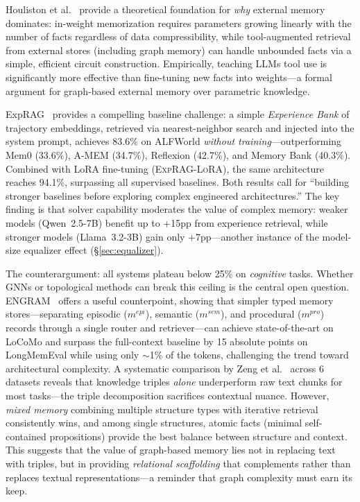 \documentclass[hf]{ceurart}
\begin{document}
Houliston et al.~\cite{toolscalable2026} provide a theoretical
foundation for \emph{why} external memory dominates: in-weight
memorization requires parameters growing linearly with the number
of facts regardless of data compressibility, while tool-augmented
retrieval from external stores (including graph memory) can handle
unbounded facts via a simple, efficient circuit construction.
Empirically, teaching LLMs tool use is significantly more effective
than fine-tuning new facts into weights---a formal argument for
graph-based external memory over parametric knowledge.

ExpRAG~\cite{exprag2026} provides a compelling baseline challenge:
a simple \emph{Experience Bank} of trajectory embeddings, retrieved
via nearest-neighbor search and injected into the system prompt,
achieves 83.6\% on ALFWorld \emph{without training}---outperforming
Mem0 (33.6\%), A-MEM (34.7\%), Reflexion (42.7\%), and Memory Bank
(40.3\%). Combined with LoRA fine-tuning (\textsc{ExpRAG-LoRA}),
the same architecture reaches 94.1\%, surpassing all supervised
baselines. Both results call for ``building stronger baselines before
exploring complex engineered architectures.'' The key finding is that
solver capability moderates the value of complex memory: weaker models
(Qwen~2.5-7B) benefit up to +15pp from experience retrieval, while
stronger models (Llama~3.2-3B) gain only +7pp---another instance of
the model-size equalizer effect (\S\ref{sec:equalizer}).

The counterargument: all systems plateau below 25\% on \emph{cognitive}
tasks. Whether GNNs or topological methods can break this ceiling is
the central open question. ENGRAM~\cite{engram2025} offers a useful
counterpoint, showing that simpler typed memory stores---separating
episodic ($m^{epi}$), semantic ($m^{sem}$), and procedural
($m^{pro}$) records through a single router and retriever---can
achieve state-of-the-art on LoCoMo and surpass the full-context
baseline by 15 absolute points on LongMemEval while using only
${\sim}$1\% of the tokens, challenging the trend toward architectural
complexity. A systematic comparison
by Zeng et al.~\cite{structuralmem2024} across 6 datasets reveals
that knowledge triples \emph{alone} underperform raw text chunks for
most tasks---the triple decomposition sacrifices contextual nuance.
However, \emph{mixed memory} combining multiple structure types with
iterative retrieval consistently wins, and among single structures,
atomic facts (minimal self-contained propositions) provide the best
balance between structure and context. This suggests that the value
of graph-based memory lies not in replacing text with triples, but
in providing \emph{relational scaffolding} that complements rather
than replaces textual representations---a reminder that graph
complexity must earn its keep.
\end{document}
